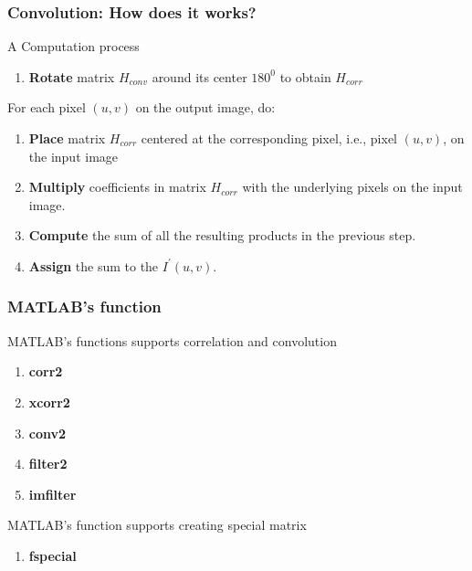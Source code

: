 \documentclass[english,11pt,table,handout]{beamer}
\begin{document}
\frame
{
	\frametitle{Convolution: How does it works?}
	\begin{block}{A Computation process}
		\begin{enumerate}
			\item \textbf{Rotate} matrix $H_{conv}$ around its center $180^0$ to obtain $H_{corr}$
		\end{enumerate}
		For each pixel $(u,v)$ on the output image, do:
		\begin{enumerate}
			\item \textbf{Place} matrix $H_{corr}$ centered at the corresponding pixel, i.e., pixel $(u,v)$, on the input image
			\item \textbf{Multiply} coefficients in matrix $H_{corr}$ with the underlying pixels on the input image.
			\item \textbf{Compute} the sum of all the resulting products in the previous step.
			\item \textbf{Assign} the sum to the $I^{'}(u,v)$.
		\end{enumerate}
		
	\end{block}
}
\frame
{
	\frametitle{MATLAB's function}
	\begin{example}
		MATLAB's functions supports correlation and convolution
		\begin{enumerate}
			\item \alert{\textbf{corr2}}
			\item \alert{\textbf{xcorr2}}
			\item \alert{\textbf{conv2}}
			\item \alert{\textbf{filter2}}
			\item \alert{\textbf{imfilter}}
		\end{enumerate}
			MATLAB's function supports creating special matrix
			\begin{enumerate}
				\item \alert{\textbf{fspecial}}
			\end{enumerate}
	\end{example}
}
\end{document}
